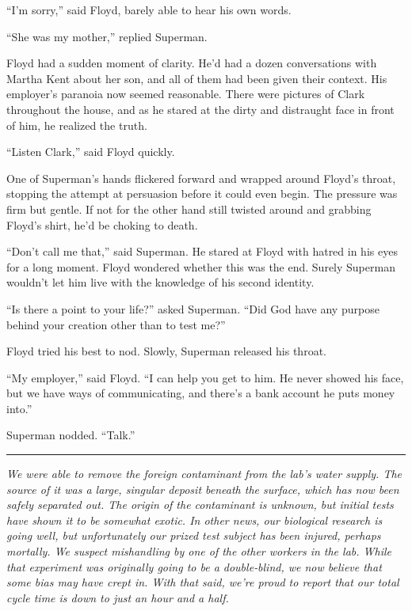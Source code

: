 \documentclass[ebook,12pt]{memoir}
\begin{document}
``I'm sorry,'' said Floyd, barely able to hear his own words.

``She was my mother,'' replied Superman.

Floyd had a sudden moment of clarity. He'd had a dozen conversations
with Martha Kent about her son, and all of them had been given their
context. His employer's paranoia now seemed reasonable. There were
pictures of Clark throughout the house, and as he stared at the dirty
and distraught face in front of him, he realized the truth.

``Listen Clark,'' said Floyd quickly.

One of Superman's hands flickered forward and wrapped around Floyd's
throat, stopping the attempt at persuasion before it could even begin.
The pressure was firm but gentle. If not for the other hand still
twisted around and grabbing Floyd's shirt, he'd be choking to death.

``Don't call me that,'' said Superman. He stared at Floyd with hatred in
his eyes for a long moment. Floyd wondered whether this was the end.
Surely Superman wouldn't let him live with the knowledge of his second
identity.

``Is there a point to your life?'' asked Superman. ``Did God have any
purpose behind your creation other than to test me?''

Floyd tried his best to nod. Slowly, Superman released his throat.

``My employer,'' said Floyd. ``I can help you get to him. He never
showed his face, but we have ways of communicating, and there's a bank
account he puts money into.''

Superman nodded. ``Talk.''

\begin{center}\rule{0.5\linewidth}{\linethickness}\end{center}

\emph{We were able to remove the foreign contaminant from the lab's
water supply. The source of it was a large, singular deposit beneath the
surface, which has now been safely separated out. The origin of the
contaminant is unknown, but initial tests have shown it to be somewhat
exotic. In other news, our biological research is going well, but
unfortunately our prized test subject has been injured, perhaps
mortally. We suspect mishandling by one of the other workers in the lab.
While that experiment was originally going to be a double‐blind, we now
believe that some bias may have crept in. With that said, we're proud to
report that our total cycle time is down to just an hour and a half.}
\end{document}
